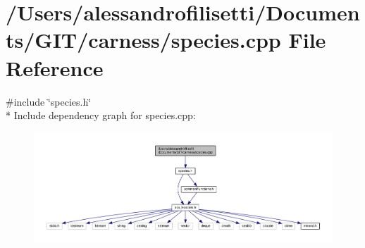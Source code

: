 \hypertarget{a00094}{\section{/\-Users/alessandrofilisetti/\-Documents/\-G\-I\-T/carness/species.cpp File Reference}
\label{a00094}
}
{\ttfamily \#include \char`\"{}species.\-h\char`\"{}}\\*
Include dependency graph for species.\-cpp\-:\nopagebreak
\begin{figure}[H]
\begin{center}
\leavevmode
\includegraphics[width=350pt]{a00144}
\end{center}
\end{figure}
